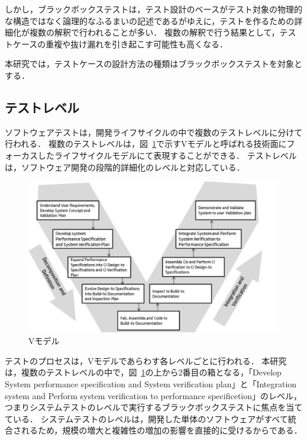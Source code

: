 しかし，ブラックボックステストは，テスト設計のベースがテスト対象の物理的な構造ではなく論理的なふるまいの記述であるがゆえに，テストを作るための詳細化が複数の解釈で行われることが多い．
複数の解釈で行う結果として，テストケースの重複や抜け漏れを引き起こす可能性も高くなる．

本研究では，テストケースの設計方法の種類はブラックボックステストを対象とする．

\subsection{テストレベル}

ソフトウェアテストは，開発ライフサイクルの中で複数のテストレベルに分けて行われる．
複数のテストレベルは，図~\ref{fig:D-2-Fig1}で示すVモデルと呼ばれる技術面にフォーカスしたライフサイクルモデルにて表現することができる\cite{forsberg}．
テストレベルは，ソフトウェア開発の段階的詳細化のレベルと対応している\cite{pressman2005software}．

\begin{figure}[htbp]
  \begin{center}
  \includegraphics[width=12cm]{./image/D-2-Fig1.png}
  \caption{Vモデル}
  \label{fig:D-2-Fig1}
  \end{center}
\end{figure}

テストのプロセスは，Vモデルであらわす各レベルごとに行われる．
本研究は，複数のテストレベルの中で，図~\ref{fig:D-2-Fig1}の上から2番目の箱となる，「Develop System performance specification and System verification plan」と「Integration system and Perform system verification to performance specificetion」のレベル，つまりシステムテストのレベルで実行するブラックボックステストに焦点を当てている．
システムテストのレベルは，開発した単体のソフトウェアがすべて統合されるため，規模の増大と複雑性の増加の影響を直接的に受けるからである．

